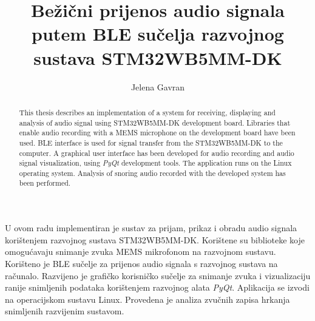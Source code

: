 \documentclass[times, utf8, zavrsni, numeric]{fer}
\renewcommand*\lstlistlistingname{Popis isječaka koda}
\begin{document}

\title{Bežični prijenos audio signala putem BLE sučelja razvojnog sustava STM32WB5MM-DK}

\author{Jelena Gavran}

\maketitle


\zahvala{}

\tableofcontents

\begingroup
\renewcommand*\listfigurename{Popis slika}
\listoffigures
\addcontentsline{toc}{chapter}{\lstlistlistingname}
\lstlistoflistings
\listoftables
\endgroup












{}


\begin{sazetak}
U ovom radu implementiran je sustav za prijam, prikaz i obradu audio signala korištenjem razvojnog sustava STM32WB5MM-DK. Korištene su biblioteke koje omogućavaju snimanje zvuka MEMS mikrofonom na razvojnom sustavu. Korišteno je BLE sučelje za prijenos audio signala s razvojnog sustava na računalo. Razvijeno je grafičko korisničko sučelje za snimanje zvuka i vizualizaciju ranije snimljenih podataka korištenjem razvojnog alata \textit{PyQt}. Aplikacija se izvodi na operacijskom sustavu Linux. Provedena je analiza zvučnih zapisa hrkanja snimljenih razvijenim sustavom. 

\end{sazetak}

\begin{abstract}
This thesis describes an implementation of a system for receiving, displaying and analysis of audio signal using STM32WB5MM-DK development board. Libraries that enable audio recording with a MEMS microphone on the development board have been used. BLE interface is used for signal transfer from the STM32WB5MM-DK to the computer. A graphical user interface has been developed for audio recording and audio signal visualization, using \textit{PyQt} development tools. The application runs on the Linux operating system. Analysis of snoring audio recorded with the developed system has been performed. 

\end{abstract}
\end{document}
